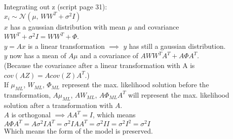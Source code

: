 %
\begin{flushleft}
Integrating out z (script page 31):\\
$x_i \sim \mathcal{N}(\mu, \, W W^{T} + \sigma^{2}I)$\\
$x$ has a gaussian distribution with mean $\mu$ and covariance 
$W W^{T} + \sigma^{2}I = W W^{T} + \Phi$.\\
$y = Ax$ is a linear transformation $\implies$ $y$ has still a gaussian distribution.\\
$y$ now has a mean of $A\mu$ and a covariance of $AW W^{T}A^{T} + A \Phi A^{T}$.\\
(Because the covariance after a linear transformation with A is $cov(AZ)=Acov(Z)A^{T}$.)\\
If $\mu_{ML}$, $W_{ML}$, $\Phi_{ML}$ represent the max. likelihood solution before the transformation, $A\mu_{ML}$, $AW_{ML}$, $A\Phi_{ML}A^{T}$ will represent the max. likelihood solution after a transformation with $A$.\\
$A$ is orthogonal $\implies AA^{T}=I$, which means $A \Phi A^{T} = A \sigma^{2}I A^{T} = \sigma^{2}I A A^{T} = \sigma^{2}I I = \sigma^{2}I^{2} = \sigma^{2}I$\\
Which means the form of the model is preserved.

\end{flushleft}
%
%
%
%
%
%
